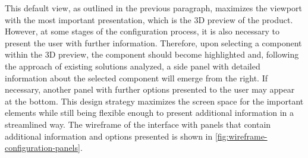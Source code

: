 This default view, as outlined in the previous paragraph, maximizes the viewport with the most important presentation, which is the 3D preview of the product. However, at some stages of the configuration process, it is also necessary to present the user with further information. Therefore, upon selecting a component within the 3D preview, the component should become highlighted and, following the approach of existing solutions analyzed, a side panel with detailed information about the selected component will emerge from the right. If necessary, another panel with further options presented to the user may appear at the bottom. This design strategy maximizes the screen space for the important elements while still being flexible enough to present additional information in a streamlined way. The wireframe of the interface with panels that contain additional information and options presented is shown in \autoref{fig:wireframe-configuration-panels}.

